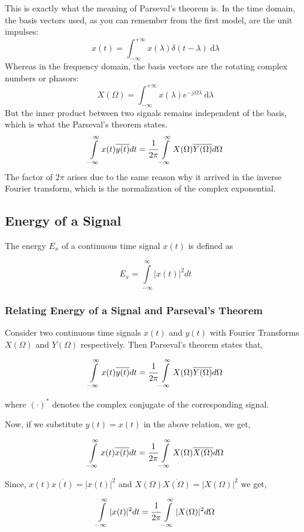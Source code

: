 This is exactly what the meaning of Parseval's theorem is. In the time domain, the basis vectors used, as you can remember from the first model, are the unit impulses:
\[
x(t) = \int_{-\infty}^{+\infty} \! x(\lambda)\delta(t-\lambda) \ \mathrm{d}\lambda
\]
Whereas in the frequency domain, the basis vectors are the rotating complex numbers or phasors:
\[
X(\Omega) = \int_{-\infty}^{+\infty} \! x(\lambda)e^{-j\Omega\lambda} \ \mathrm{d}\lambda
\]
But the inner product between two signals remains independent of the basis, which is what the Parseval's theorem states.
\[
\int\limits_{-\infty}^{\infty}x(t)\overline{y(t)}dt = \cfrac{1}{2\pi}\int\limits_{-\infty}^{\infty}X(\Omega)\overline{Y(\Omega)}d\Omega
\]
The factor of $2\pi$ arises due to the same reason why it arrived in the inverse Fourier transform, which is the normalization of the complex exponential.
\subsection{Energy of a Signal}
\noindent
The energy $E_x$ of a continuous time signal $x(t)$ is defined as

$$E_x = \int\limits_{-\infty}^{\infty}|x(t)|^2dt$$

\subsubsection{Relating Energy of a Signal and Parseval's Theorem}
\noindent
Consider two continuous time signals $x(t)$ and $y(t)$ with Fourier Transforms $X(\Omega)$ and $Y(\Omega)$ respectively. Then Parseval's theorem states that,

$$\int\limits_{-\infty}^{\infty}x(t)\overline{y(t)}dt = \cfrac{1}{2\pi}\int\limits_{-\infty}^{\infty}X(\Omega)\overline{Y(\Omega)}d\Omega$$

\noindent
where $(\cdot)^*$ denotes the complex conjugate of the corresponding signal.

\noindent
Now, if we substitute $y(t) = x(t)$ in the above relation, we get,

$$\int\limits_{-\infty}^{\infty}x(t)\overline{x(t)}dt = \cfrac{1}{2\pi}\int\limits_{-\infty}^{\infty}X(\Omega)\overline{X(\Omega)}d\Omega$$

\noindent
Since, $x(t)\overline{x(t)} = |x(t)|^2$ and $X(\Omega)\overline{X(\Omega)} = |X(\Omega)|^2$ we get,

$$\int\limits_{-\infty}^{\infty}|x(t)|^2dt = \cfrac{1}{2\pi}\int\limits_{-\infty}^{\infty}|X(\Omega)|^2d\Omega$$

